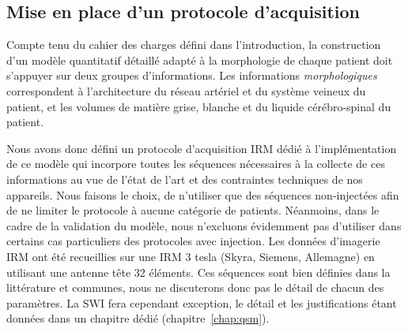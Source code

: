 \subsection{Mise en place d'un protocole d'acquisition}
Compte tenu du cahier des charges défini dans l’introduction, la construction d’un modèle quantitatif détaillé adapté à la morphologie de chaque patient doit s’appuyer sur deux groupes d’informations. Les informations {\em morphologiques} correspondent à l’architecture du réseau artériel et du système veineux du patient, et les volumes de matière grise, blanche et du liquide cérébro-spinal du patient.

Nous avons donc défini un protocole d’acquisition IRM dédié à l’implémentation de ce modèle qui incorpore toutes les séquences nécessaires à la collecte de ces informations au vue de l’état de l’art et des contraintes techniques de nos appareils. Nous faisons le choix, de n’utiliser que des séquences non-injectées afin de ne limiter le protocole à aucune catégorie de patients. Néanmoins, dans le cadre de la validation du modèle,  nous n’excluons évidemment pas d’utiliser dans certains cas particuliers des protocoles avec injection. Les données d’imagerie IRM ont été recueillies sur une IRM 3 tesla (Skyra, Siemens, Allemagne) en utilisant une antenne tête 32 éléments. Ces séquences sont bien définies dans la littérature et communes, nous ne discuterons donc pas le détail de chacun des paramètres. La SWI fera cependant exception, le détail et les justifications étant données dans un chapitre dédié (chapitre~\ref{chap:qsm}).

